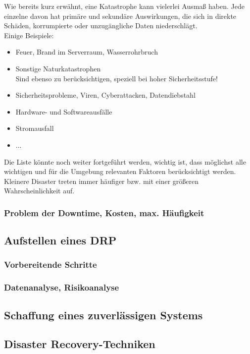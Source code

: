 \documentclass[letterpaper, 12pt]{article}
\let\tempsubsection\subsection
\renewcommand\subsection[1]{\vspace{0cm}\tempsubsection{#1}\vspace{0cm}}
\let\tempsubsubsection\subsubsection
\renewcommand\subsubsection[1]{\vspace{0cm}\tempsubsubsection{#1}\vspace{0cm}}
\begin{document}
Wie bereits kurz erwähnt, eine Katastrophe kann vielerlei Ausmaß haben. Jede einzelne davon hat primäre und sekundäre Auswirkungen, die sich in direkte Schäden, korrumpierte oder unzugängliche Daten niederschlägt. \\
Einige Beispiele:

\begin{itemize}
	\item Feuer, Brand im Serverraum, Wasserrohrbruch
	\item Sonstige Naturkatastrophen \\ Sind ebenso zu berücksichtigen, speziell bei hoher Sicherheitsstufe!
	\item Sicherheitsprobleme, Viren, Cyberattacken, Datendiebstahl
	\item Hardware- und Softwareausfälle
	\item Stromausfall
	\item ...
\end{itemize}

Die Liste könnte noch weiter fortgeführt werden, wichtig ist, dass möglichst alle wichtigen und für die Umgebung relevanten Faktoren berücksichtigt werden. Kleinere Disaster treten immer häufiger bzw. mit einer größeren Wahrscheinlichkeit auf.

\subsubsection{Problem der Downtime, Kosten, max. Häufigkeit}

\subsection{Aufstellen eines DRP}

\subsubsection{Vorbereitende Schritte}

\subsubsection{Datenanalyse, Risikoanalyse}

\subsection{Schaffung eines zuverlässigen Systems}

\subsection{Disaster Recovery-Techniken}

\clearpage



\lstlistoflistings
\listoffigures
\end{document}
